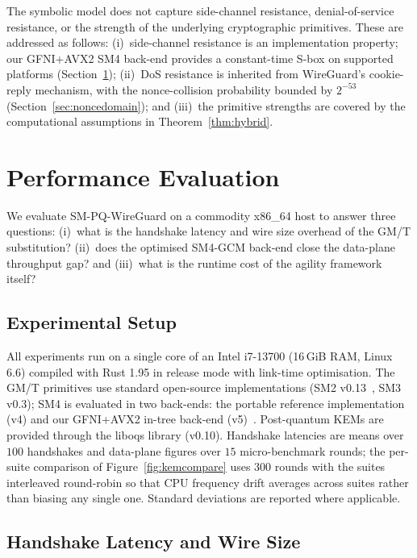 \documentclass{SCIS2026}
\begin{document}
The symbolic model does not capture side-channel resistance,
denial-of-service resistance, or the strength of the underlying
cryptographic primitives.  These are addressed as follows:
(i)~side-channel resistance is an implementation property; our
GFNI+AVX2 SM4 back-end provides a constant-time S-box on supported
platforms (Section~\ref{sec:perf}); (ii)~DoS resistance is inherited
from WireGuard's cookie-reply mechanism, with the nonce-collision
probability bounded by $2^{-53}$ (Section~\ref{sec:noncedomain}); and
(iii)~the primitive strengths are covered by the computational
assumptions in Theorem~\ref{thm:hybrid}.

\section{Performance Evaluation}
\label{sec:perf}

We evaluate SM-PQ-WireGuard on a commodity x86\_64 host to answer three
questions: (i)~what is the handshake latency and wire size overhead of
the GM/T substitution? (ii)~does the optimised SM4-GCM back-end close
the data-plane throughput gap? and (iii)~what is the runtime cost of
the agility framework itself?

\subsection{Experimental Setup}
\label{sec:setup}

All experiments run on a single core of an Intel i7-13700 (16\,GiB RAM,
Linux 6.6) compiled with Rust 1.95 in release mode with link-time
optimisation.  The GM/T primitives use standard open-source
implementations (SM2 v0.13~\cite{41}, SM3 v0.3); SM4 is
evaluated in two back-ends: the portable reference implementation (v4)
and our GFNI+AVX2 in-tree back-end (v5)~\cite{42}.  Post-quantum KEMs are provided
through the liboqs library (v0.10).  Handshake latencies are means
over $100$ handshakes and data-plane figures over $15$ micro-benchmark
rounds; the per-suite comparison of Figure~\ref{fig:kemcompare} uses
$300$ rounds with the suites interleaved round-robin so that CPU
frequency drift averages across suites rather than biasing any single
one.  Standard deviations are reported where applicable.

\subsection{Handshake Latency and Wire Size}
\label{sec:q1q2}
\end{document}
